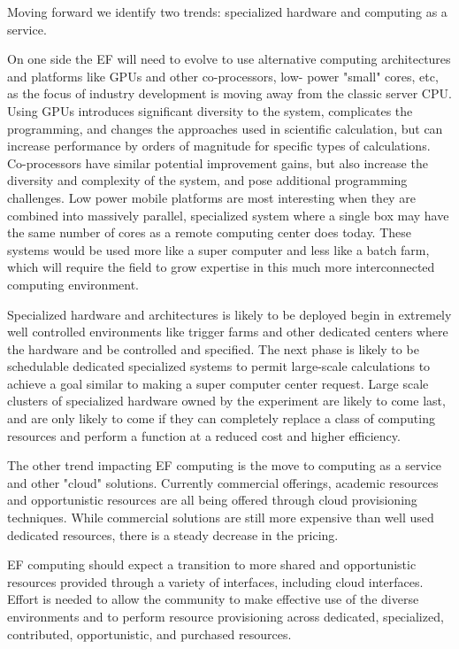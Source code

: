 Moving forward we identify two trends: specialized hardware and computing as a service.

On one side the EF will need to evolve to use alternative
computing architectures and platforms like GPUs and other co-processors, low-
power "small" cores, etc, as the focus of industry development is moving away
from the classic server CPU.  Using GPUs introduces significant diversity to
the system, complicates the programming, and changes the approaches used in
scientific calculation, but can increase performance by orders of magnitude
for specific types of calculations.  Co-processors have similar potential
improvement gains, but also increase the diversity and complexity of the system, and pose
additional programming challenges.  Low power mobile platforms are most
interesting when they are combined into massively parallel, specialized system
where a single box may have the same number of cores as a remote computing
center does today.  These systems would be used more like a super computer and
less like a batch farm, which will require the field to grow expertise in this
much more interconnected computing environment.

Specialized hardware and architectures is likely to be deployed begin in
extremely well controlled environments like trigger farms and other dedicated
centers where the hardware and be controlled and specified. The next phase is
likely to be schedulable dedicated specialized systems to permit large-scale
calculations to achieve a goal similar to making a super computer center
request.  Large scale clusters of specialized hardware owned by the experiment
are likely to come last, and are only likely to come if they can completely
replace a class of computing resources and perform a function at a reduced
cost and higher efficiency.

The other trend impacting EF computing is the move to
computing as a service and other "cloud" solutions.  Currently
commercial offerings, academic resources and opportunistic resources
are all being offered through cloud provisioning techniques.  While
commercial solutions are still more expensive than well used dedicated
resources, there is a steady decrease in the pricing. 

EF
computing should expect a transition to more shared and opportunistic
resources provided through a variety of interfaces, including cloud interfaces.  
Effort is needed
to allow the community to make effective use of the diverse
environments and to perform resource provisioning across dedicated,
specialized, contributed, opportunistic, and purchased resources.

